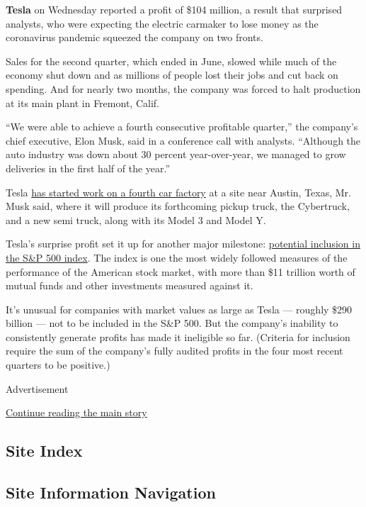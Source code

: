 \textbf{Tesla} on Wednesday reported a profit of \$104 million, a result
that surprised analysts, who were expecting the electric carmaker to
lose money as the coronavirus pandemic squeezed the company on two
fronts.

Sales for the second quarter, which ended in June, slowed while much of
the economy shut down and as millions of people lost their jobs and cut
back on spending. And for nearly two months, the company was forced to
halt production at its main plant in Fremont, Calif.

``We were able to achieve a fourth consecutive profitable quarter,'' the
company's chief executive, Elon Musk, said in a conference call with
analysts. ``Although the auto industry was down about 30 percent
year-over-year, we managed to grow deliveries in the first half of the
year.''

Tesla
\href{https://www.nytimes3xbfgragh.onion/live/2020/07/22/business/stock-market-today-coronavirus/tesla-is-building-a-fourth-factory-in-texas}{has
started work on a fourth car factory} at a site near Austin, Texas, Mr.
Musk said, where it will produce its forthcoming pickup truck, the
Cybertruck, and a new semi truck, along with its Model 3 and Model Y.

Tesla's surprise profit set it up for another major milestone:
\href{https://www.nytimes3xbfgragh.onion/live/2020/07/22/business/stock-market-today-coronavirus/tesla-s-and-p-500}{potential
inclusion in the S\&P 500 index}. The index is one the most widely
followed measures of the performance of the American stock market, with
more than \$11 trillion worth of mutual funds and other investments
measured against it.

It's unusual for companies with market values as large as Tesla ---
roughly \$290 billion --- not to be included in the S\&P 500. But the
company's inability to consistently generate profits has made it
ineligible so far. (Criteria for inclusion require the sum of the
company's fully audited profits in the four most recent quarters to be
positive.)

Advertisement

\protect\hyperlink{after-bottom}{Continue reading the main story}

\hypertarget{site-index}{%
\subsection{Site Index}\label{site-index}}

\hypertarget{site-information-navigation}{%
\subsection{Site Information
Navigation}\label{site-information-navigation}}

